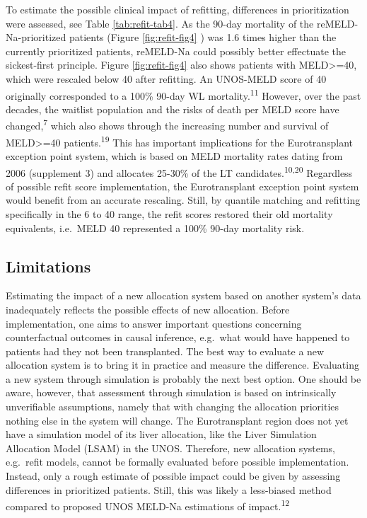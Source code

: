 \documentclass[11pt,english,]{book} %
\begin{document}
To estimate the possible clinical impact of refitting, differences in prioritization were assessed, see Table \ref{tab:refit-tab4}. As the 90-day mortality of the reMELD-Na-prioritized patients (Figure \ref{fig:refit-fig4} ) was 1.6 times higher than the currently prioritized patients, reMELD-Na could possibly better effectuate the sickest-first principle. Figure \ref{fig:refit-fig4} also shows patients with MELD\textgreater=40, which were rescaled below 40 after refitting. An UNOS-MELD score of 40 originally corresponded to a 100\% 90-day WL mortality.\textsuperscript{11} However, over the past decades, the waitlist population and the risks of death per MELD score have changed,\textsuperscript{7} which also shows through the increasing number and survival of MELD\textgreater=40 patients.\textsuperscript{19} This has important implications for the Eurotransplant exception point system, which is based on MELD mortality rates dating from 2006 (supplement 3) and allocates 25-30\% of the LT candidates.\textsuperscript{10,20} Regardless of possible refit score implementation, the Eurotransplant exception point system would benefit from an accurate rescaling. Still, by quantile matching and refitting specifically in the 6 to 40 range, the refit scores restored their old mortality equivalents, i.e.~MELD 40 represented a 100\% 90-day mortality risk.

\hypertarget{limitations-1}{%
\subsection*{Limitations}\label{limitations-1}}

Estimating the impact of a new allocation system based on another system's data inadequately reflects the possible effects of new allocation. Before implementation, one aims to answer important questions concerning counterfactual outcomes in causal inference, e.g.~what would have happened to patients had they not been transplanted. The best way to evaluate a new allocation system is to bring it in practice and measure the difference. Evaluating a new system through simulation is probably the next best option. One should be aware, however, that assessment through simulation is based on intrinsically unverifiable assumptions, namely that with changing the allocation priorities nothing else in the system will change. The Eurotransplant region does not yet have a simulation model of its liver allocation, like the Liver Simulation Allocation Model (LSAM) in the UNOS. Therefore, new allocation systems, e.g.~refit models, cannot be formally evaluated before possible implementation. Instead, only a rough estimate of possible impact could be given by assessing differences in prioritized patients. Still, this was likely a less-biased method compared to proposed UNOS MELD-Na estimations of impact.\textsuperscript{12}
\end{document}

